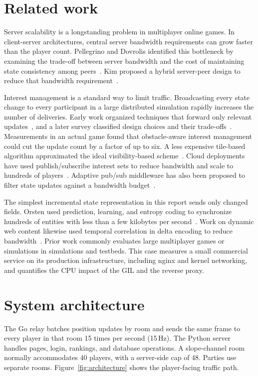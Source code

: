 \documentclass[11pt,a4paper]{article}
\begin{document}
\section{Related work}
Server scalability is a longstanding problem in multiplayer online games. In client-server
architectures, central server bandwidth requirements can grow faster than the player count.
Pellegrino and Dovrolis identified this bottleneck by examining the trade-off between server
bandwidth and the cost of maintaining state consistency among peers~\cite{pellegrino_2003_12}.
Kim proposed a hybrid server-peer design to reduce that bandwidth requirement~\cite{kim_2013}.

Interest management is a standard way to limit traffic. Broadcasting every state change to every
participant in a large distributed simulation rapidly increases the number of deliveries. Early
work organized techniques that forward only relevant updates~\cite{morse_2000_1}, and a later
survey classified design choices and their trade-offs~\cite{liu_2014_2}. Measurements in an
actual game found that obstacle-aware interest management could cut the update count by a factor
of up to six. A less expensive tile-based algorithm approximated the ideal visibility-based
scheme~\cite{boulanger_2006_10}. Cloud deployments have used publish/subscribe interest sets to
reduce bandwidth and scale to hundreds of players~\cite{najaran_2010_5}. Adaptive pub/sub
middleware has also been proposed to filter state updates against a bandwidth
budget~\cite{gascon_samson_2015_6}.

The simplest incremental state representation in this report sends only changed fields.
Orsten used prediction, learning, and entropy coding to synchronize hundreds of entities with
less than a few kilobytes per second~\cite{orsten_2011_4}. Work on dynamic web content likewise
used temporal correlation in delta encoding to reduce bandwidth~\cite{psounis_2002_11}. Prior
work commonly evaluates large multiplayer games or simulations in simulations and testbeds.
This case measures a small commercial service on its production infrastructure, including nginx
and kernel networking, and quantifies the CPU impact of the GIL and the reverse proxy.

\section{System architecture}
The Go relay batches position updates by room and sends the same frame to every player in that
room 15 times per second (15\,Hz). The Python server handles pages, login, rankings, and database
operations. A slope-channel room normally accommodates 40 players, with a server-side cap of
48. Parties use separate rooms. Figure~\ref{fig:architecture} shows the player-facing traffic path.
\end{document}
